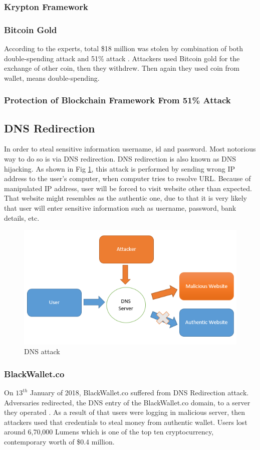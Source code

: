 \documentclass[a4paper,twoside,12pt]{report}
\begin{document}
\begin{spacing}{1.5}
\subsubsection{Krypton Framework}
\cite{51attackonethereum}
\subsubsection{Bitcoin Gold}
According to the experts, total \$18 million was stolen by combination of both double-spending attack and 51\% attack \cite{51attackonbitcoingold}. Attackers used Bitcoin gold for the exchange of other coin, then they withdrew. Then again they used coin from wallet, means double-spending. 
\subsubsection{Protection of Blockchain Framework From 51\% Attack}
\subsection{DNS Redirection}
In order to steal sensitive information username, id and password. Most notorious way to do so is via DNS redirection. DNS redirection is also known as DNS hijacking. As shown in Fig \ref{img: dns}, this attack is performed by sending wrong IP address to the user's computer, when computer tries to resolve URL. Because of manipulated IP address, user will be forced to visit website other than expected. That website might resembles as the authentic one, due to that it is very likely that user will enter sensitive information such as 
username, password, bank details, etc.
\begin{figure}[h!]
\begin{center}
  \includegraphics[width=0.8\linewidth]{images/dns.png}
  \caption{DNS attack}
  \label{img: dns}
\end{center}
\end{figure}
\subsubsection{BlackWallet.co}
On $13^{th}$ January of 2018, BlackWallet.co suffered from DNS Redirection attack. Adversaries redirected, the DNS entry of the BlackWallet.co domain, to a server they operated \cite{blackwallet_nodate}. As a result of that users were logging in malicious server, then attackers used that credentials to steal money from authentic wallet. Users lost around 6,70,000 Lumens which is one of the top ten cryptocurrency, contemporary worth of \$0.4 million. 

\end{spacing}
\end{document}
